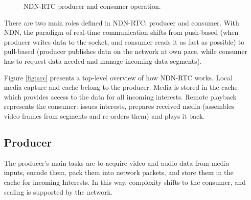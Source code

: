 \documentclass{icn/sig-alternate-2012} %
\newcommand{\ndnrtcName}{NDN-RTC} %
\begin{document}
\begin{figure}[t!]
\centering
{}\qquad
{}
\caption{\ndnrtcName{} producer and consumer operation.}
\end{figure}



There are two main roles defined in \ndnrtcName{}: producer and consumer. With NDN, the paradigm of real-time communication shifts from push-based (when producer writes data to the socket, and consumer reads it as fast as possible) to pull-based (producer publishes data on the network at own pace, while consumer has to request data needed and manage incoming data segments).

%

Figure \ref{fig:arc} presents a top-level overview of how \ndnrtcName{} works. Local media capture and cache belong to the producer. Media is stored in the cache which provides access to the data for all incoming interests. Remote playback represents the consumer: issues interests, prepares received media (assembles video frames from segments and re-orders them) and plays it back.

\subsection{Producer}
The producer's main tasks are to acquire video and audio data from media inputs, encode them, pack them into network packets, and store them in the cache for incoming Interests. In this way, complexity shifts to the consumer, and scaling is supported by the network.
\end{document}
